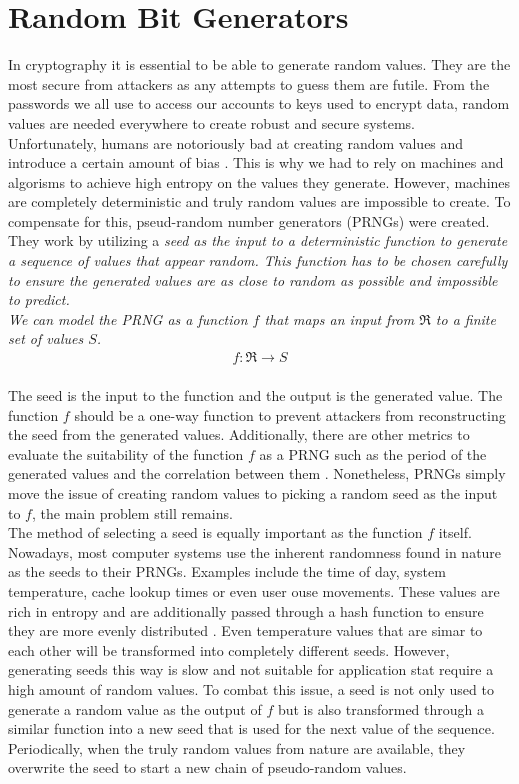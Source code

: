 \section{Random Bit Generators}

In cryptography it is essential to be able to generate random values. They are the most secure from attackers as any attempts to guess them are futile. From the passwords we all use to access our accounts to keys used to encrypt data, random values are needed everywhere to create robust and secure systems.
\\

Unfortunately, humans are notoriously bad at creating random values and introduce a certain amount of bias \cite{human-randomness}. This is why we had to rely on machines and algorisms to achieve high entropy on the values they generate. However, machines are completely deterministic and truly random values are impossible to create. To compensate for this, pseud-random number generators (PRNGs) were created. They work by utilizing a \it{seed} as the input to a deterministic function to generate a sequence of values that appear random. This function has to be chosen carefully to ensure the generated values are as close to random as possible and impossible to predict.
\\

We can model the PRNG as a function $f$ that maps an input from $\Re$ to a finite set of values $S$. \cite{prng}
\begin{align}
    f: \Re \rightarrow S\\
\end{align}

The seed is the input to the function and the output is the generated value. The function $f$ should be a one-way function \cite{one-way-function} to prevent attackers from reconstructing the seed from the generated values. Additionally, there are other metrics to evaluate the suitability of the function $f$ as a PRNG such as the period of the generated values and the correlation between them \cite{prng}. Nonetheless, PRNGs simply move the issue of creating random values to picking a random seed as the input to $f$, the main problem still remains.
\\

The method of selecting a seed is equally important as the function $f$ itself. Nowadays, most computer systems use the inherent randomness found in nature as the seeds to their PRNGs. Examples include the time of day, system temperature, cache lookup times or even user ouse movements. These values are rich in entropy and are additionally passed through a hash function to ensure they are more evenly distributed \cite{prng}. Even temperature values that are simar to each other will be transformed into completely different seeds. However, generating seeds this way is slow and not suitable for application stat require a high amount of random values. To combat this issue, a seed is not only used to generate a random value as the output of $f$ but is also transformed through a similar function into a new seed that is used for the next value of the sequence. Periodically, when the truly random values from nature are available, they overwrite the seed to start a new chain of pseudo-random values.

